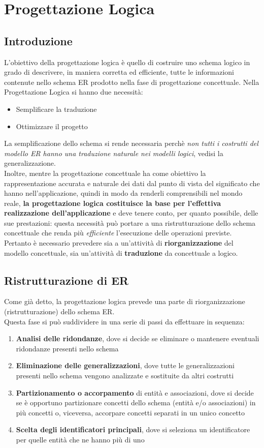 \documentclass[12pt, a4paper, openany]{book}
\begin{document}
\chapter{Progettazione Logica}
\section{Introduzione}
L'obiettivo della progettazione logica è quello di costruire uno schema logico in grado di descrivere, in maniera corretta ed efficiente, tutte le informazioni contenute nello schema ER prodotto nella fase di progettazione concettuale.
Nella Progettazione Logica si hanno due necessità:
\begin{itemize}
    \item Semplificare la traduzione
    \item Ottimizzare il progetto
\end{itemize}
La semplificazione dello schema si rende necessaria perchè \emph{non tutti i costrutti del modello ER hanno una traduzione naturale nei modelli logici}, vedisi la generalizzazione.
\\Inoltre, mentre la progettazione concettuale ha come obiettivo la rappresentazione accurata e naturale dei dati dal punto di vista del significato che hanno nell'applicazione, quindi in modo da renderli comprensibili nel mondo reale, 
\textbf{la progettazione logica costituisce la base per l'effettiva realizzazione dell'applicazione}
e deve tenere conto, per quanto possibile, delle sue prestazioni: questa necessità può portare a una ristrutturazione dello schema concettuale che renda più \emph{efficiente} l'esecuzione delle operazioni previste.
\\Pertanto è necessario prevedere sia a un'attività di \textbf{riorganizzazione} del modello concettuale, sia un'attività di \textbf{traduzione} da concettuale a logico.


\section{Ristrutturazione di ER}
Come già detto, la progettazione logica prevede una parte di riorganizzazione (ristrutturazione) dello schema ER.
\\Questa fase si può suddividere in una serie di passi da effettuare in sequenza:
\begin{enumerate}
    \item \textbf{Analisi delle ridondanze}, dove si decide se eliminare o mantenere eventuali ridondanze presenti nello schema
    \item \textbf{Eliminazione delle generalizzazioni}, dove tutte le generalizzazioni presenti nello schema vengono analizzate e sostituite da altri costrutti
    \item \textbf{Partizionamento o accorpamento} di entità e associazioni, dove si decide se è opportuno partizionare concetti dello schema (entità e/o associazioni) in più concetti o, viceversa, accorpare concetti separati in un unico concetto
    \item \textbf{Scelta degli identificatori principali}, dove si seleziona un identificatore per quelle entità che ne hanno più di uno
\end{enumerate}
\end{document}
